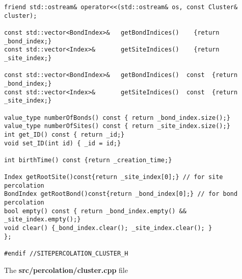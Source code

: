 \begin{lstlisting}[style=CStyle]
friend std::ostream& operator<<(std::ostream& os, const Cluster& cluster);

const std::vector<BondIndex>&   getBondIndices()    {return _bond_index;}
const std::vector<Index>&       getSiteIndices()    {return _site_index;}

const std::vector<BondIndex>&   getBondIndices()  const  {return _bond_index;}
const std::vector<Index>&       getSiteIndices()  const  {return _site_index;}

value_type numberOfBonds() const { return _bond_index.size();}
value_type numberOfSites() const { return _site_index.size();}
int get_ID() const { return _id;}
void set_ID(int id) { _id = id;}

int birthTime() const {return _creation_time;}

Index getRootSite()const{return _site_index[0];} // for site percolation
BondIndex getRootBond()const{return _bond_index[0];} // for bond percolation
bool empty() const { return _bond_index.empty() && _site_index.empty();}
void clear() {_bond_index.clear(); _site_index.clear(); }
};

#endif //SITEPERCOLATION_CLUSTER_H
\end{lstlisting}

The \textbf{src/percolation/cluster.cpp} file

